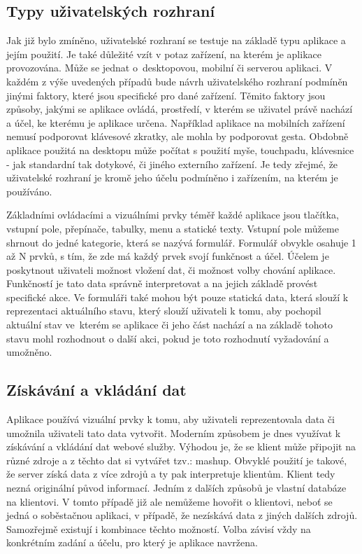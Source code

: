 \subsection{Typy uživatelských rozhraní}
Jak již bylo zmíněno, uživatelské rozhraní se testuje na základě typu aplikace a jejím použití. Je také důležité vzít v potaz zařízení, na kterém je aplikace provozována. Může se jednat o~desktopovou, mobilní či serverou aplikaci. V každém z výše uvedených případů bude návrh uživatelského rozhraní podmíněn jinými faktory, které jsou specifické pro dané zařízení. Těmito faktory jsou způsoby, jakými se aplikace ovládá, prostředí, v kterém se uživatel právě nachází a účel, ke kterému je aplikace určena. Například aplikace na mobilních zařízení nemusí podporovat klávesové zkratky, ale mohla by podporovat gesta. Obdobně aplikace použitá na desktopu může počítat s použití myše, touchpadu, klávesnice - jak standardní tak dotykové, či jiného externího zařízení. Je tedy zřejmé, že uživatelské rozhraní je kromě jeho účelu podmíněno i zařízením, na kterém je používáno.

Základními ovládacími a vizuálními prvky téměř každé aplikace jsou tlačítka, vstupní pole, přepínače, tabulky, menu a statické texty. Vstupní pole můžeme shrnout do jedné kategorie, která se nazývá formulář. Formulář obvykle osahuje 1 až N prvků, s tím, že zde má každý prvek svojí funkčnost a účel. Účelem je poskytnout uživateli možnost vložení dat, či možnost volby chování aplikace. Funkčností je tato data správně interpretovat a na jejich základě provést specifické akce. Ve formuláři také mohou být pouze statická data, která slouží k reprezentaci aktuálního stavu, který slouží uživateli k tomu, aby pochopil aktuální stav ve~kterém se aplikace či jeho část nachází a na základě tohoto stavu mohl rozhodnout o další akci, pokud je toto rozhodnutí vyžadování a umožněno.
\subsection{Získávání a vkládání dat}
Aplikace používá vizuální prvky k tomu, aby uživateli reprezentovala data či umožnila uživateli tato data vytvořit. Moderním způsobem je dnes využívat k získávání a vkládání dat webové služby. Výhodou je, že se klient může připojit na různé zdroje a z těchto dat si vytvářet tzv.: mashup. Obvyklé použití je takové, že server získá data z více zdrojů a ty pak interpretuje klientům. Klient tedy nezná originální původ informací. Jedním z dalších způsobů je vlastní databáze na klientovi. V tomto případě již ale nemůžeme hovořit o klientovi, neboť se jedná o soběstačnou aplikaci, v případě, že nezískává data z jiných dalších zdrojů. Samozřejmě existují i kombinace těchto možností. Volba závisí vždy na konkrétním zadání a účelu, pro který je aplikace navržena.

